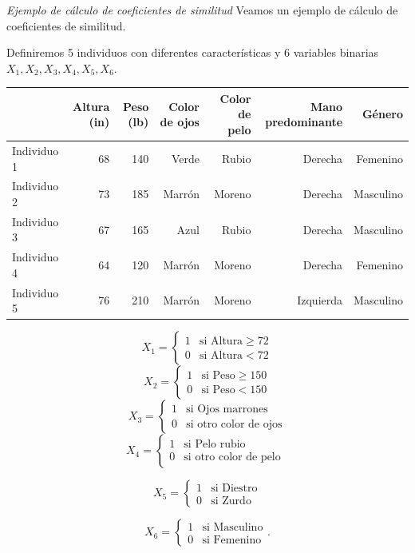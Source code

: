 \documentclass[spanish]{beamer}
\begin{document}
\begin{frame}{\textit{Ejemplo de cálculo de coeficientes de similitud}}
Veamos un ejemplo de cálculo de coeficientes de similitud.\break

Definiremos 5 individuos con diferentes características y 6 variables binarias $X_1,X_2,X_3,X_4,X_5,X_6$.
\begin{table}[h]
  \centering
  \label{tab:ej-similitud}
\resizebox{11cm}{!} {
  \begin{tabular}{lrrrrrr}
    \toprule
            & Altura (in) & Peso (lb) & Color de ojos & Color de pelo & Mano predominante & Género \\ \midrule
Individuo 1 & 68                       & 140                    & Verde                             & Rubio                             & Derecha                               & Femenino\\
Individuo 2 & 73 & 185 & Marrón & Moreno & Derecha & Masculino                  \\
Individuo 3 & 67 & 165 & Azul & Rubio & Derecha & Masculino                  \\
Individuo 4 & 64 & 120 & Marrón & Moreno                            & Derecha & Femenino \\
Individuo 5 & 76 & 210 & Marrón & Moreno & Izquierda & Masculino\\                 
\bottomrule
\end{tabular}
}
\end{table}
\end{frame}

\begin{frame}{}
$$X_1 = \left \{ \begin{matrix} 1 & \mbox{si Altura}  \geq 72 
\\ 0 & \mbox{si Altura}  < 72 \end{matrix}\right.$$
$$X_2 = \left \{ \begin{matrix} 1 & \mbox{si Peso}  \geq 150 
\\ 0 & \mbox{si Peso}  < 150 \end{matrix}\right.   $$
$$X_3 = \left \{ \begin{matrix} 1 & \mbox{si Ojos marrones} 
\\ 0 & \mbox{si otro color de ojos}\end{matrix}\right.   $$
$$X_4 = \left \{ \begin{matrix} 1 & \mbox{si Pelo rubio} 
\\ 0 & \mbox{si otro color de pelo } \end{matrix}\right.   $$

$$X_5 = \left \{ \begin{matrix} 1 & \mbox{si Diestro} 
\\ 0 & \mbox{si Zurdo } \end{matrix}\right.   $$

$$X_6 = \left \{ \begin{matrix} 1 & \mbox{si Masculino} 
\\ 0 & \mbox{si Femenino}  \end{matrix}\right.   .$$
\end{frame}
\end{document}
